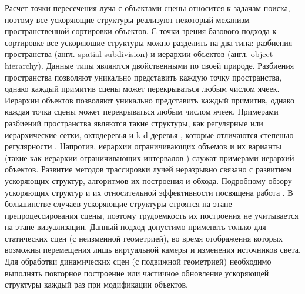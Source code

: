 Расчет точки пересечения луча с объектами сцены относится к задачам поиска, поэтому все ускоряющие структуры реализуют некоторый механизм пространственной сортировки объектов. С точки зрения базового подхода к сортировке все ускоряющие структуры можно разделить на два типа: разбиения пространства (англ. spatial subdivision) и иерархии объектов (англ. object hierarchy). Данные типы являются двойственными по своей природе. Разбиения пространства позволяют уникально представить каждую точку пространства, однако каждый примитив сцены может перекрываться любым числом ячеек. Иерархии объектов позволяют уникально представить каждый примитив, однако каждая точка сцены может перекрываться любым числом ячеек. Примерами разбиений пространства являются такие структуры, как регулярные \todo{[11]} или иерархические \todo{[12]} сетки, октодеревья \todo{[13]} и k-d деревья \todo{[14]}, которые отличаются степенью регулярности \todo{[15]}. Напротив, иерархии ограничивающих объемов \todo{[16]} и их варианты (такие как иерархии ограничивающих интервалов \todo{[17; 18]}) служат примерами иерархий объектов. Развитие методов трассировки лучей неразрывно связано с развитием ускоряющих структур, алгоритмов их построения и обхода. Подробному обзору ускоряющих структур и их относительной эффективности посвящена работа \todo{[19]}.
В большинстве случаев ускоряющие структуры строятся на этапе препроцессирования сцены, поэтому трудоемкость их построения не учитывается на этапе визуализации. Данный подход допустимо применять только для статических сцен (с неизменной геометрией), во время отображения которых возможны перемещения лишь виртуальной камеры и изменения источников света. Для обработки динамических сцен (с подвижной геометрией) необходимо выполнять повторное построение или частичное обновление ускоряющей структуры каждый раз при модификации объектов.